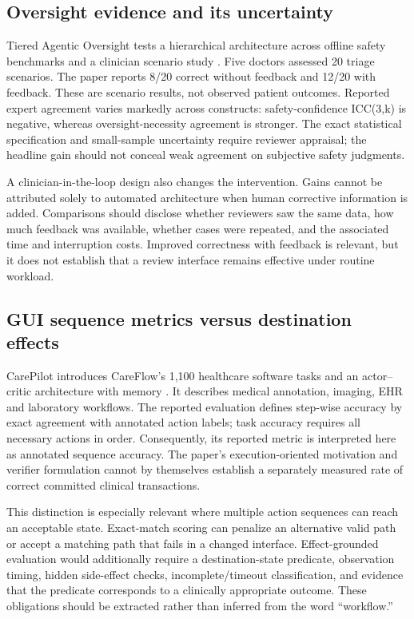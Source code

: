 \documentclass[journal,10pt]{IEEEtran}
\begin{document}
\subsection{Oversight evidence and its uncertainty}
Tiered Agentic Oversight tests a hierarchical architecture across offline safety benchmarks and a clinician scenario study \cite{tieredoversight}. Five doctors assessed 20 triage scenarios. The paper reports 8/20 correct without feedback and 12/20 with feedback. These are scenario results, not observed patient outcomes. Reported expert agreement varies markedly across constructs: safety-confidence ICC(3,k) is negative, whereas oversight-necessity agreement is stronger. The exact statistical specification and small-sample uncertainty require reviewer appraisal; the headline gain should not conceal weak agreement on subjective safety judgments.

A clinician-in-the-loop design also changes the intervention. Gains cannot be attributed solely to automated architecture when human corrective information is added. Comparisons should disclose whether reviewers saw the same data, how much feedback was available, whether cases were repeated, and the associated time and interruption costs. Improved correctness with feedback is relevant, but it does not establish that a review interface remains effective under routine workload.

\subsection{GUI sequence metrics versus destination effects}
CarePilot introduces CareFlow's 1,100 healthcare software tasks and an actor--critic architecture with memory \cite{carepilot}. It describes medical annotation, imaging, EHR and laboratory workflows. The reported evaluation defines step-wise accuracy by exact agreement with annotated action labels; task accuracy requires all necessary actions in order. Consequently, its reported metric is interpreted here as annotated sequence accuracy. The paper's execution-oriented motivation and verifier formulation cannot by themselves establish a separately measured rate of correct committed clinical transactions.

This distinction is especially relevant where multiple action sequences can reach an acceptable state. Exact-match scoring can penalize an alternative valid path or accept a matching path that fails in a changed interface. Effect-grounded evaluation would additionally require a destination-state predicate, observation timing, hidden side-effect checks, incomplete/timeout classification, and evidence that the predicate corresponds to a clinically appropriate outcome. These obligations should be extracted rather than inferred from the word ``workflow.''
\end{document}
